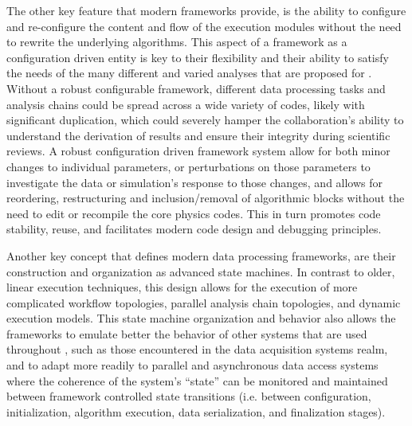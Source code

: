 \documentclass[../main-v1.tex]{subfiles}
\begin{document}
The other key feature that modern frameworks provide, is the ability to configure and re-configure the content and flow of the execution modules without the need to rewrite the underlying algorithms.  This aspect of a framework as a configuration driven entity is key to their flexibility and their ability to satisfy the needs of the many different and varied analyses that are proposed for .  Without a robust configurable framework, different data processing tasks and analysis chains could be spread across a wide variety of codes, likely with significant duplication, which could severely hamper the collaboration's ability to understand the derivation of results and ensure their integrity during scientific reviews.  A robust configuration driven framework system allow for both minor changes to individual parameters, or perturbations on those parameters to investigate the data or simulation's response to those changes, and allows for reordering, restructuring and inclusion/removal of algorithmic blocks without the need to edit or recompile the core physics codes.  This in turn promotes code stability, reuse, and facilitates modern code design and debugging principles.  

Another key concept that defines modern data processing frameworks, are their construction and organization as advanced state machines.  In contrast to older, linear execution techniques, this design allows for the execution of more complicated workflow topologies, parallel analysis chain topologies, and dynamic execution models.  This state machine organization and behavior also allows the frameworks to emulate better the behavior of other systems that are used throughout  , such as those encountered in the data acquisition systems realm, and to adapt more readily to parallel and asynchronous data access systems where the coherence of the system's ``state'' can be monitored and maintained between framework controlled state transitions (i.e. between configuration, initialization, algorithm execution, data serialization, and finalization stages).  
\end{document}
